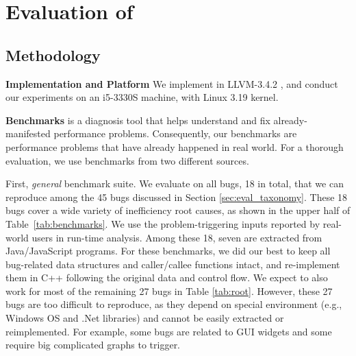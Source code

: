 \section{Evaluation of \Tool}
\label{sec:experiment}

\subsection{Methodology}
\label{sec:result_meth}



\noindent\textbf{Implementation and Platform}
We implement \Tool in LLVM-3.4.2 \cite{llvm}, and conduct our
experiments on an i5-3330S machine, with Linux 3.19 kernel. 

\noindent\textbf{Benchmarks}
\Tool is a diagnosis tool that helps understand and fix 
already-manifested performance problems.
Consequently, our benchmarks are performance problems that have already
happened in real world.
For a thorough evaluation, we use
benchmarks from two different sources.

First, \emph{general} benchmark suite.
We evaluate \Tool on all bugs, 18 in total, that we can reproduce 
among the 45 bugs discussed in Section \ref{sec:eval_taxonomy}. 
These 18 bugs cover a wide variety of inefficiency root causes, as 
shown in the upper half of Table~\ref{tab:benchmarks}. 
We use the problem-triggering inputs reported by real-world
users in \Tool run-time analysis.
Among these 18, seven are extracted from Java/JavaScript
programs.
For these benchmarks, we did our best to keep all bug-related data structures
and caller/callee functions intact, and re-implement them in C++
following the original data and control flow. 
We expect \Tool to also work for most of 
the remaining 27 bugs in Table \ref{tab:root}.
However, these 27 bugs are too difficult to reproduce, as they 
depend on special environment (e.g., Windows OS and 
.Net libraries) and cannot be easily extracted or reimplemented. 
For example, some bugs are related to GUI widgets and some 
require big complicated graphs to trigger.

